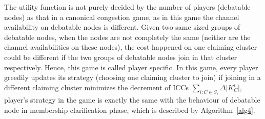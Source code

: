 \begin{itemize}
The utility function is not purely decided by the number of players (debatable nodes) as that in a canonical congestion game, as in this game the channel availability on debatable nodes is different.
Given two same sized groups of debatable nodes, when the nodes are not completely the same (neither are the channel availabilities on these nodes), the cost happened on one claiming cluster could be different if the two groups of debatable nodes join in that cluster respectively.
Hence, this game is called player specific.
In this game, every player greedily updates its strategy (choosing one claiming cluster to join) if joining in a different claiming cluster minimizes the decrement of ICCs $\sum_{i:C\in S_i} \Delta\vert K^i_C \vert$, player's strategy in the game is exactly the same with the behaviour of debatable node in membership clarification phase, which is described by Algorithm~\ref{alg4}.




\end{itemize}


